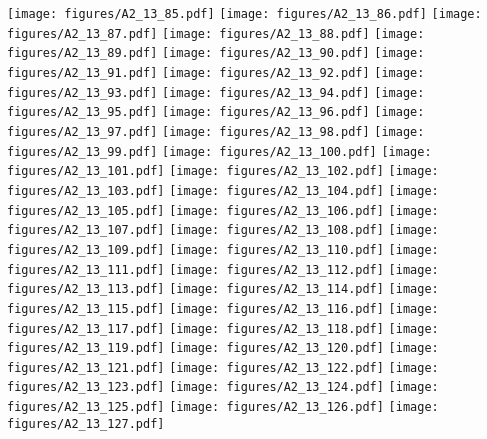 \documentclass[12pt,a4paper]{article}
\begin{document}
\texttt{[image: figures/A2\_13\_85.pdf]}
\texttt{[image: figures/A2\_13\_86.pdf]}
\texttt{[image: figures/A2\_13\_87.pdf]}
\texttt{[image: figures/A2\_13\_88.pdf]}
\texttt{[image: figures/A2\_13\_89.pdf]}
\texttt{[image: figures/A2\_13\_90.pdf]}
\texttt{[image: figures/A2\_13\_91.pdf]}
\texttt{[image: figures/A2\_13\_92.pdf]}
\texttt{[image: figures/A2\_13\_93.pdf]}
\texttt{[image: figures/A2\_13\_94.pdf]}
\texttt{[image: figures/A2\_13\_95.pdf]}
\texttt{[image: figures/A2\_13\_96.pdf]}
\texttt{[image: figures/A2\_13\_97.pdf]}
\texttt{[image: figures/A2\_13\_98.pdf]}
\texttt{[image: figures/A2\_13\_99.pdf]}
\texttt{[image: figures/A2\_13\_100.pdf]}
\texttt{[image: figures/A2\_13\_101.pdf]}
\texttt{[image: figures/A2\_13\_102.pdf]}
\texttt{[image: figures/A2\_13\_103.pdf]}
\texttt{[image: figures/A2\_13\_104.pdf]}
\texttt{[image: figures/A2\_13\_105.pdf]}
\texttt{[image: figures/A2\_13\_106.pdf]}
\texttt{[image: figures/A2\_13\_107.pdf]}
\texttt{[image: figures/A2\_13\_108.pdf]}
\texttt{[image: figures/A2\_13\_109.pdf]}
\texttt{[image: figures/A2\_13\_110.pdf]}
\texttt{[image: figures/A2\_13\_111.pdf]}
\texttt{[image: figures/A2\_13\_112.pdf]}
\texttt{[image: figures/A2\_13\_113.pdf]}
\texttt{[image: figures/A2\_13\_114.pdf]}
\texttt{[image: figures/A2\_13\_115.pdf]}
\texttt{[image: figures/A2\_13\_116.pdf]}
\texttt{[image: figures/A2\_13\_117.pdf]}
\texttt{[image: figures/A2\_13\_118.pdf]}
\texttt{[image: figures/A2\_13\_119.pdf]}
\texttt{[image: figures/A2\_13\_120.pdf]}
\texttt{[image: figures/A2\_13\_121.pdf]}
\texttt{[image: figures/A2\_13\_122.pdf]}
\texttt{[image: figures/A2\_13\_123.pdf]}
\texttt{[image: figures/A2\_13\_124.pdf]}
\texttt{[image: figures/A2\_13\_125.pdf]}
\texttt{[image: figures/A2\_13\_126.pdf]}
\texttt{[image: figures/A2\_13\_127.pdf]}
\end{document}
